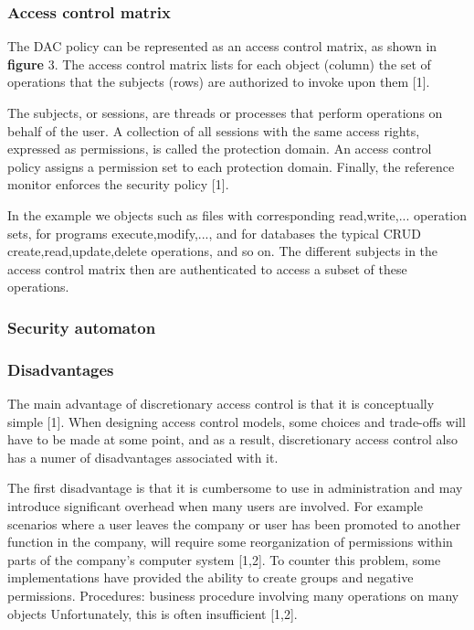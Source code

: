 \subsubsection{Access control matrix}

The DAC policy can be represented as an access control matrix, as shown in \textbf{figure} 3. The access control matrix lists for each object (column) the set of operations that the subjects (rows) are authorized to invoke upon them [1].

The subjects, or sessions, are threads or processes that perform operations on behalf of the user. A collection of all sessions with the same access rights, expressed as permissions, is called the protection domain. An access control policy assigns a permission set to each protection domain. Finally, the reference monitor enforces the security policy [1].

In the example we objects such as files with corresponding {read,write,...} operation sets, for programs {execute,modify,...}, and for databases the typical CRUD {create,read,update,delete} operations, and so on. The different subjects in the access control matrix then are authenticated to access a subset of these operations.


\subsubsection{Security automaton}



\subsubsection{Disadvantages}

The main advantage of discretionary access control is that it is conceptually simple [1]. When designing access control models, some choices and trade-offs will have to be made at some point, and as a result, discretionary access control also has a numer of disadvantages associated with it.

The first disadvantage is that it is cumbersome to use in administration and may introduce significant overhead when many users are involved. For example scenarios where a user leaves the company or user has been promoted to another function in the company, will require some reorganization of permissions within parts of the company's computer system [1,2]. To counter this problem, some implementations have provided the ability to create groups and negative permissions. Procedures: business procedure involving many operations on many objects Unfortunately, this is often insufficient [1,2].

